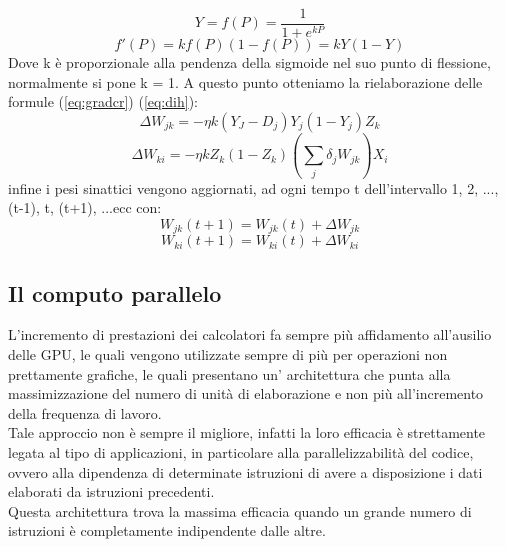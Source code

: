 \documentclass[10pt,a4paper]{article}
\begin{document}
\begin{equation}
Y = f(P) = \frac{1}{1+e^{kP}}
\end{equation}
\begin{equation}
f'(P) = kf(P)(1-f(P)) = kY(1-Y)
\end{equation}
Dove k è proporzionale alla pendenza della sigmoide nel suo punto di flessione, normalmente si pone k = 1.
A questo punto otteniamo la rielaborazione delle formule (\ref{eq:gradcr}) (\ref{eq:dih}):
\begin{equation}
\Delta W_{jk} = -\eta k (Y_J - D_j)Y_j(1-Y_j)Z_k
\end{equation} 
\begin{equation}
\Delta W_{ki} = -\eta k Z_k (1-Z_k)(\sum_j \delta_j W_{jk})X_i
\end{equation} 
infine i pesi sinattici vengono aggiornati, ad ogni tempo t dell'intervallo 1, 2, ..., (t-1), t, (t+1), ...ecc con:
\begin{equation}
W_{jk}(t+1) = W_{jk}(t) + \Delta W_{jk}
\end{equation}
\begin{equation}
W_{ki}(t+1) = W_{ki}(t) + \Delta W_{ki}
\end{equation} 
\clearpage
\subsection{Il computo parallelo}
L'incremento di prestazioni dei calcolatori fa sempre più affidamento all'ausilio delle GPU, le quali vengono utilizzate sempre di più per operazioni non prettamente grafiche, le quali presentano un' architettura che punta alla massimizzazione del numero di unità di elaborazione e non più all'incremento della frequenza di lavoro.\\
Tale approccio non è sempre il migliore, infatti la loro efficacia è strettamente legata al tipo di applicazioni, in particolare alla parallelizzabilità del codice, ovvero alla dipendenza di determinate istruzioni di avere a disposizione i dati elaborati da istruzioni precedenti.\\
Questa architettura trova la massima efficacia quando un grande numero di istruzioni è completamente indipendente dalle altre. 
\end{document}
